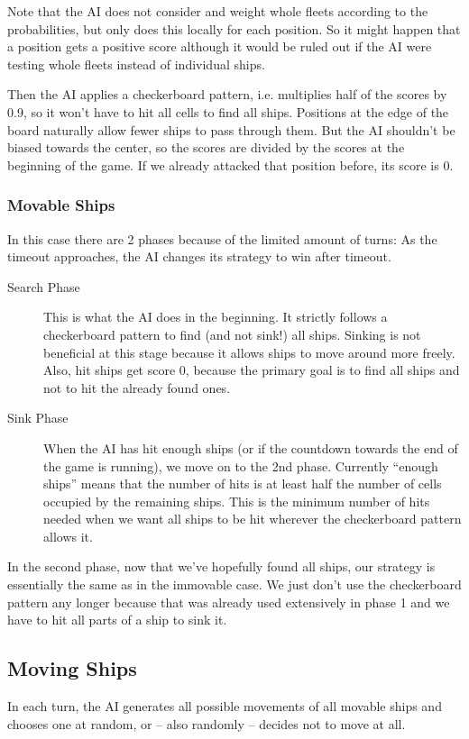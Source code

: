 \documentclass[a4paper]{easychair}
\begin{document}
Note that the AI does not consider and weight whole fleets according to the probabilities, but only does this locally for each position. So it might happen that a position gets a positive score although it would be ruled out if the AI were testing whole fleets instead of individual ships.

Then the AI applies a checkerboard pattern, i.e. multiplies half of the scores by 0.9, so it won't have to hit all cells to find all ships. Positions at the edge of the board naturally allow fewer ships to pass through them. But the AI shouldn't be biased towards the center, so the scores are divided by the scores at the beginning of the game. If we already attacked that position before, its score is 0.

\subsubsection{Movable Ships} In this case there are 2 phases because of the limited amount of turns: As the timeout approaches, the AI changes its strategy to win after timeout. 
\begin{description}
 \item[Search Phase] 
 This is what the AI does in the beginning. It strictly follows a checkerboard pattern to find (and not sink!) all ships. Sinking is not beneficial at this stage because it allows ships to move around more freely. Also, hit ships get score 0, because the primary goal is to find all ships and not to hit the already found ones.
 \item[Sink Phase] 
 When the AI has hit enough ships (or if the countdown towards the end of the game is running), we move on to the 2nd phase. Currently ``enough ships'' means that the number of hits is at least half the number of cells occupied by the remaining ships. This is the minimum number of hits needed when we want all ships to be hit wherever the checkerboard pattern allows it.
\end{description}
In the second phase, now that we've hopefully found all ships, our strategy is essentially the same as in the immovable case. We just don't use the checkerboard pattern any longer because that was already used extensively in phase 1 and we have to hit all parts of a ship to sink it.


\subsection{Moving Ships}
In each turn, the AI generates all possible movements of all movable ships and chooses one at random, or -- also randomly -- decides not to move at all. %

%
\label{sect:bib}

%
%
%
%


\end{document}
